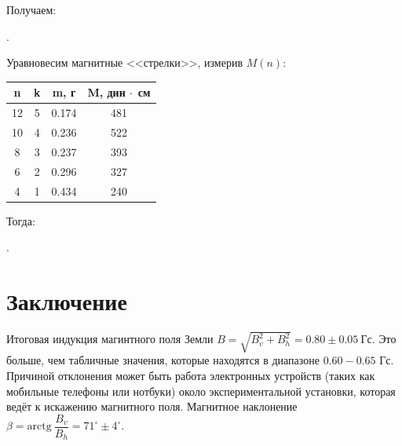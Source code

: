 Получаем:
\begin{center}
 .
\end{center}
	Уравновесим магнитные <<стрелки>>, измерив $M(n)$:
\n\n
\begin{minipage}{0.4\textwidth}
\begin{tabular}{|c|c|c|c|}
\hline
n  & k & m, г  & M, дин $\cdot$ см \\ \hline
12 & 5 & 0.174 & 481 \\ \hline
10 & 4 & 0.236 & 522 \\ \hline
8  & 3 & 0.237 & 393 \\ \hline
6  & 2 & 0.296 & 327 \\ \hline
4  & 1 & 0.434 & 240 \\ \hline
\end{tabular}
\end{minipage}
\begin{minipage}{0.2\textwidth}
\end{minipage}
\n\n
Тогда:
\begin{center}
 .
\end{center} 
	\section*{Заключение}
	Итоговая индукция магинтного поля Земли $B = \sqrt{B_v^2 + B_h^2} = 0.80 \pm 0.05 \ \text{Гс}$. Это больше, чем табличные значения, которые находятся в диапазоне $0.60 - 0.65$ Гс. Причиной отклонения может быть работа электронных устройств (таких как мобильные телефоны или нотбуки) около экспериментальной установки, которая ведёт к искажению магнитного поля.
Магнитное наклонение $\beta= \text{arctg}~\dfrac{B_v}{B_h}=71^\circ\pm 4^\circ$.
